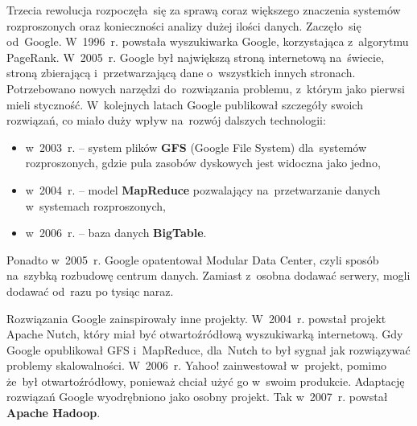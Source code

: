 \documentclass[12pt,a4paper,twoside,titlepage,openright]{book}
\begin{document}
Trzecia rewolucja rozpoczęła~się za sprawą coraz większego znaczenia systemów rozproszonych oraz konieczności analizy dużej ilości danych. Zaczęło~się od~Google. W~1996~r. powstała wyszukiwarka Google, korzystająca z~algorytmu PageRank. W~2005~r. Google był największą stroną internetową na~świecie, stroną zbierającą i~przetwarzającą dane o~wszystkich innych stronach. Potrzebowano nowych narzędzi do~rozwiązania problemu, z~którym jako pierwsi mieli styczność. W~kolejnych latach Google publikował szczegóły swoich rozwiązań, co miało duży wpływ na~rozwój dalszych technologii:
\begin{itemize}
\item w~2003~r. -- system plików \textbf{GFS} (Google File System) dla~systemów rozproszonych, gdzie pula zasobów dyskowych jest widoczna jako jedno,
\item w~2004~r. -- model \textbf{MapReduce} pozwalający na~przetwarzanie danych w~systemach rozproszonych,
\item w~2006~r. -- baza danych \textbf{BigTable}.
\end{itemize}
Ponadto w~2005~r. Google opatentował Modular Data Center, czyli sposób na~szybką rozbudowę centrum danych. Zamiast z~osobna dodawać serwery, mogli dodawać od~razu po tysiąc naraz.

Rozwiązania Google zainspirowały inne projekty. W~2004~r. powstał projekt Apache Nutch, który miał być otwartoźródłową wyszukiwarką internetową. Gdy Google opublikował GFS i~MapReduce, dla~Nutch to był sygnał jak rozwiązywać problemy skalowalności. W~2006~r. Yahoo! zainwestował w~projekt, pomimo że~był otwartoźródłowy, ponieważ chciał użyć go w~swoim produkcie. Adaptację rozwiązań Google wyodrębniono jako osobny projekt. Tak w~2007~r. powstał \textbf{Apache Hadoop}. \cite{hadoop}
\end{document}
